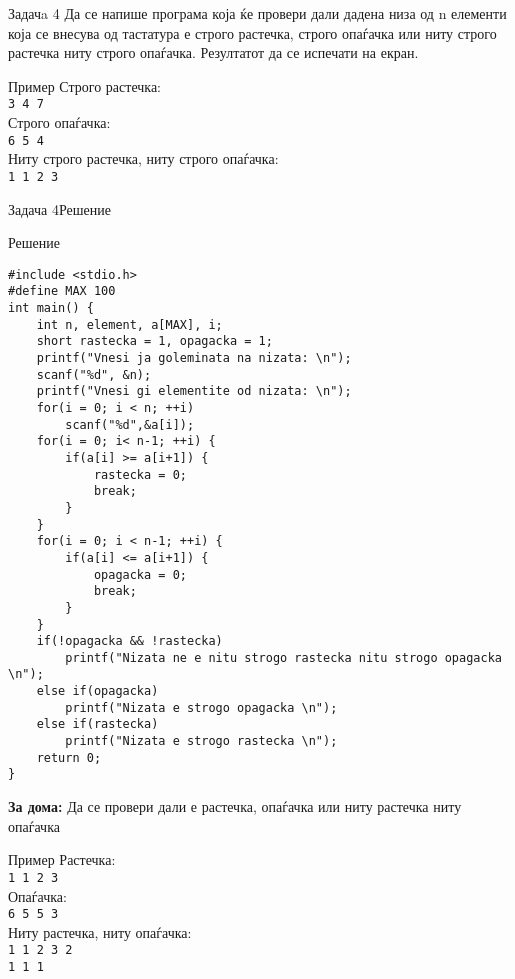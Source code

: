\begin{frame}{Задачa 4}
Да се напише програма која ќе провери дали дадена низа од n елементи која се
внесува од тастатура е строго растечка, строго опаѓачка или ниту строго растечка
ниту строго опаѓачка. Резултатот да се испечати на екран.
\begin{exampleblock}{Пример}
Строго растечка:\\
\texttt{3 4 7}\\
Строго опаѓачка:\\
\texttt{6 5 4}\\
Ниту строго растечка, ниту строго опаѓачка:\\
\texttt{1 1 2 3}\\
\end{exampleblock}
\end{frame}


\begin{frame}[fragile,shrink=10]{Задача 4}{Решение} 
\begin{exampleblock}{Решение}
\begin{lstlisting}
#include <stdio.h>
#define MAX 100
int main() {
    int n, element, a[MAX], i;
    short rastecka = 1, opagacka = 1;
    printf("Vnesi ja goleminata na nizata: \n");
    scanf("%d", &n);
    printf("Vnesi gi elementite od nizata: \n");
    for(i = 0; i < n; ++i)
        scanf("%d",&a[i]);
    for(i = 0; i< n-1; ++i) {
        if(a[i] >= a[i+1]) {
            rastecka = 0;
            break;
        }
    }    
    for(i = 0; i < n-1; ++i) {
        if(a[i] <= a[i+1]) {
            opagacka = 0;
            break;
        }
    }
    if(!opagacka && !rastecka)
        printf("Nizata ne e nitu strogo rastecka nitu strogo opagacka \n");
    else if(opagacka)
        printf("Nizata e strogo opagacka \n");
    else if(rastecka)
        printf("Nizata e strogo rastecka \n");
    return 0;
}
\end{lstlisting}
\end{exampleblock}
\end{frame}


\begin{frame}
\textbf{За дома:} Да се провери дали е растечка, опаѓачка или ниту растечка ниту опаѓачка\\
\begin{exampleblock}{Пример}
Растечка:\\
\texttt{1 1 2 3}\\
Опаѓачка:\\
\texttt{6 5 5 3}\\
Ниту растечка, ниту опаѓачка:\\
\texttt{1 1 2 3 2}\\
\texttt{1 1 1}\\
\end{exampleblock}
\end{frame}


